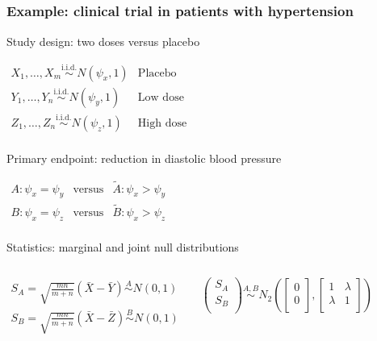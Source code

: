\subsection{}
\begin{frame}
\frametitle{Example: clinical trial in patients with hypertension} 

\textcolor{cambridgedarkorange}{Study design:} two doses versus placebo

\bigskip

$\begin{array}{cl}
   X_{1},\ldots,X_{m}\stackrel{\mathrm{i.i.d.}}{\sim} N(\psi_x,1) & \mathrm{Placebo} \\ 
   Y_{1},\ldots,Y_{n}\stackrel{\mathrm{i.i.d.}}{\sim}N(\psi_y,1) &  \mathrm{Low\,\,dose}\\ 
   Z_{1},\ldots,Z_{n}\stackrel{\mathrm{i.i.d.}}{\sim}N(\psi_z,1) & \mathrm{High\,\,dose} \\
\end{array}$


\bigskip

\textcolor{cambridgedarkorange}{Primary endpoint:} reduction in diastolic blood pressure

\bigskip

$\begin{array}{ccc}
    A: \psi_x = \psi_y & \mathrm{versus} &  \tilde{A}:  \psi_x>\psi_y \\ 
    B: \psi_x = \psi_z & \mathrm{versus}   &  \tilde{B}: \psi_x>\psi_z\\ 
\end{array}$

\bigskip

\textcolor{cambridgedarkorange}{Statistics:} marginal and joint null distributions



\begin{columns}[t]

$\begin{array}{c}
    S_A=\sqrt{\frac{mn}{m+n}}(\bar{X}-\bar{Y}) \stackrel{A}{\sim} N(0,1)\\ 
    S_B=\sqrt{\frac{mn}{m+n}}( \bar{X}-\bar{Z}) \stackrel{B}{\sim} N(0,1)\\ 
\end{array}$




$$
\left(   \begin{array}{c}
    S_A \\ 
    S_B \\ 
\end{array}\right) \stackrel{A,B}{\sim} N_{2}\left(   
\left[\begin{array}{c}
    0 \\ 
    0 \\ 
\end{array}\right], \left[\begin{array}{cc}
    1 & \lambda \\ 
    \lambda & 1\\ 
\end{array}\right]  \right)$$


\end{columns}
\end{frame}
